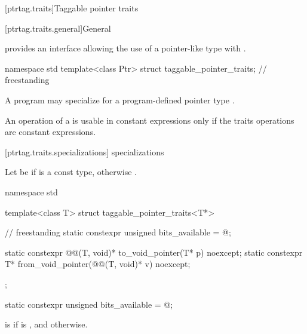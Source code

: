 \documentclass{wg21}
\begin{document}
\begin{addedblock}

[ptrtag.traits]{Taggable pointer traits}

[ptrtag.traits.general]{General}

\pnum
{} provides an interface allowing the use of
a pointer-like type with .

%
\begin{codeblock}
namespace std {
  template<class Ptr> struct taggable_pointer_traits;           // freestanding
}
\end{codeblock}

\pnum
A program may specialize 
for a program-defined pointer type .

\pnum
\begin{note}
An operation of a  is usable in constant expressions
only if the traits operations are constant expressions.
\end{note}

[ptrtag.traits.specializations]{ specializations}

\pnum
Let  be 
if  is a const type, otherwise .

%
\begin{codeblock}
namespace std {
  template<class T> struct taggable_pointer_traits<T*> {        // freestanding
    static constexpr unsigned bits_available = @\seebelow@;

    static constexpr @@(T, void)* to_void_pointer(T* p) noexcept;
    static constexpr T* from_void_pointer(@@(T, void)* v) noexcept;
  };
}
\end{codeblock}

%
\begin{itemdecl}
static constexpr unsigned bits_available = @\seebelow@;
\end{itemdecl}

\begin{itemdescr}
\pnum
{} is  if  is , and
 otherwise.
\end{itemdescr}


\end{addedblock}
\end{document}
